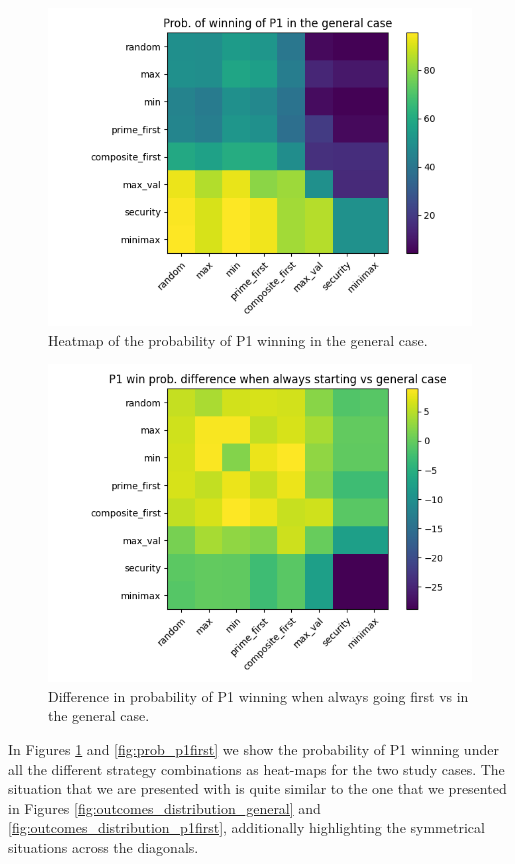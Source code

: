 \begin{figure}
	\centering
	\includegraphics[width=1\linewidth]{img/prob_general.png}
	\caption{Heatmap of the probability of P1 winning in the general case.}
	\label{fig:prob_general}
\end{figure}

\begin{figure}
	\centering
	\includegraphics[width=1\linewidth]{img/prob_diff.png}
	\caption{Difference in probability of P1 winning when always going first vs in the general case.}
	\label{fig:prob_diff}
\end{figure}

In Figures \ref{fig:prob_general} and \ref{fig:prob_p1first} we show the probability of P1 winning under all the different strategy combinations as heat-maps for the two study cases.
The situation that we are presented with is quite similar to the one that we presented in Figures \ref{fig:outcomes_distribution_general} and \ref{fig:outcomes_distribution_p1first}, additionally highlighting the symmetrical situations across the diagonals.

